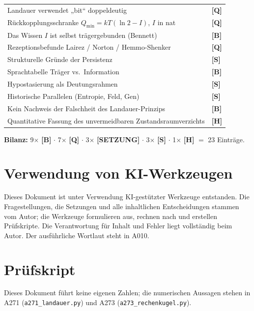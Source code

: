 \begin{center}
\begin{longtable}{@{}p{}l@{}}
Landauer verwendet „bit“ doppeldeutig & \textbf{[Q]} \\
Rückkopplungsschranke $Q_{\min} = kT(\ln 2 - I)$, $I$ in nat & \textbf{[Q]} \\
Das Wissen $I$ ist selbst trägergebunden (Bennett) & \textbf{[B]} \\
Rezeptionsbefunde Lairez / Norton / Hemmo-Shenker & \textbf{[Q]} \\
Strukturelle Gründe der Persistenz & \textbf{[S]} \\
Sprachtabelle Träger vs.\ Information & \textbf{[B]} \\
Hypostasierung als Deutungsrahmen & \textbf{[S]} \\
Historische Parallelen (Entropie, Feld, Gen) & \textbf{[S]} \\
Kein Nachweis der Falschheit des Landauer-Prinzips & \textbf{[B]} \\
Quantitative Fassung des unvermeidbaren Zustandsraumverzichts & \textbf{[H]} \\
\bottomrule
\end{longtable}
\end{center}

\textbf{Bilanz:} 9$\times$ \textbf{[B]} $\cdot$ 7$\times$ \textbf{[Q]} $\cdot$ 3$\times$ \textbf{[SETZUNG]}
$\cdot$ 3$\times$ \textbf{[S]} $\cdot$ 1$\times$ \textbf{[H]} $=$ 23 Einträge.

\section{Verwendung von KI-Werkzeugen}

Dieses Dokument ist unter Verwendung KI-gestützter Werkzeuge entstanden. Die
Fragestellungen, die Setzungen und alle inhaltlichen Entscheidungen stammen vom
Autor; die Werkzeuge formulieren aus, rechnen nach und erstellen Prüfskripte.
Die Verantwortung für Inhalt und Fehler liegt vollständig beim Autor. Der
ausführliche Wortlaut steht in A010.

\section{Prüfskript}

Dieses Dokument führt keine eigenen Zahlen; die numerischen Aussagen stehen in
A271 (\texttt{a271\_landauer.py}) und A273 (\texttt{a273\_rechenkugel.py}).

